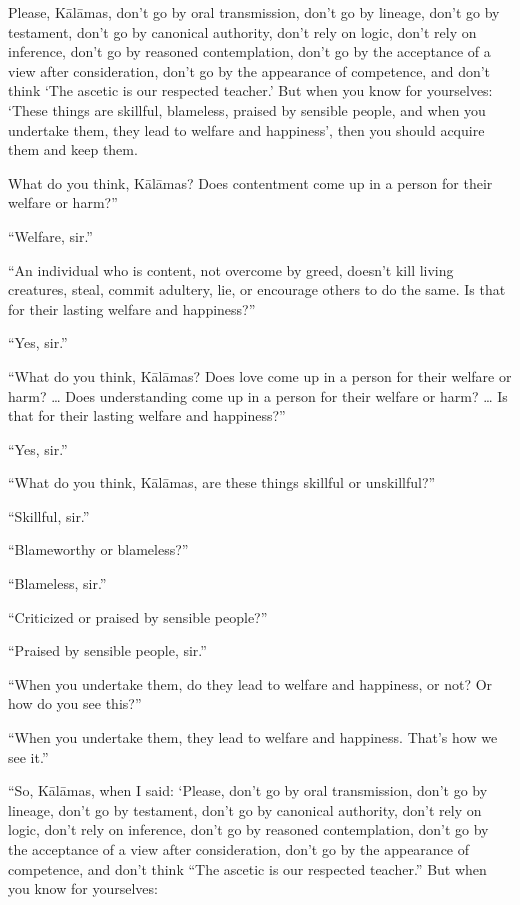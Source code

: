 \documentclass[12pt,openany]{book}%
\begin{document}
Please, \textsanskrit{Kālāmas}, don’t go by oral transmission, don’t go by lineage, don’t go by testament, don’t go by canonical authority, don’t rely on logic, don’t rely on inference, don’t go by reasoned contemplation, don’t go by the acceptance of a view after consideration, don’t go by the appearance of competence, and don’t think ‘The ascetic is our respected teacher.’ But when you know for yourselves: ‘These things are skillful, blameless, praised by sensible people, and when you undertake them, they lead to welfare and happiness’, then you should acquire them and keep them. 

What do you think, \textsanskrit{Kālāmas}? Does contentment come up in a person for their welfare or harm?” 

“Welfare, sir.” 

“An individual who is content, not overcome by greed, doesn’t kill living creatures, steal, commit adultery, lie, or encourage others to do the same. Is that for their lasting welfare and happiness?” 

“Yes, sir.” 

“What do you think, \textsanskrit{Kālāmas}? Does love come up in a person for their welfare or harm? … Does understanding come up in a person for their welfare or harm? … Is that for their lasting welfare and happiness?” 

“Yes, sir.” 

“What do you think, \textsanskrit{Kālāmas}, are these things skillful or unskillful?” 

“Skillful, sir.” 

“Blameworthy or blameless?” 

“Blameless, sir.” 

“Criticized or praised by sensible people?” 

“Praised by sensible people, sir.” 

“When you undertake them, do they lead to welfare and happiness, or not? Or how do you see this?” 

“When you undertake them, they lead to welfare and happiness. That’s how we see it.” 

“So, \textsanskrit{Kālāmas}, when I said: ‘Please, don’t go by oral transmission, don’t go by lineage, don’t go by testament, don’t go by canonical authority, don’t rely on logic, don’t rely on inference, don’t go by reasoned contemplation, don’t go by the acceptance of a view after consideration, don’t go by the appearance of competence, and don’t think “The ascetic is our respected teacher.” But when you know for yourselves: 
\end{document}
